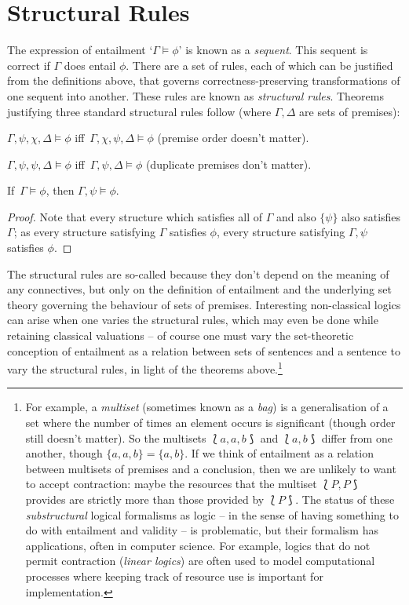 \section{Structural Rules}\label{twostruct}

The expression of entailment ‘$\Gamma \vDash \phi$’ is known as a \emph{sequent}. This sequent is correct if $\Gamma$ does entail $\phi$. There are a set of rules, each of which can be justified from the definitions above, that governs correctness-preserving transformations of one sequent into another. These rules are known as \emph{structural rules}. Theorems justifying three standard structural rules follow (where $\Gamma, \Delta$ are sets of premises): \begin{theorem}[Permutation] $\Gamma, \psi,\chi,\Delta \vDash \phi$ iff\, $\Gamma, \chi,\psi,\Delta \vDash \phi$ (premise order doesn't matter).\end{theorem}
\begin{theorem}[Contraction]$\Gamma, \psi,\psi, \Delta \vDash \phi$ iff\, $\Gamma, \psi,\Delta \vDash \phi$ (duplicate premises don't matter).
\end{theorem}
\begin{theorem}
	[Weakening] If\, $\Gamma \vDash \phi$, then $\Gamma, \psi \vDash	\phi$.
	\begin{proof}
		Note that every structure which satisfies all of $\Gamma$ and also $\{\psi\}$ also satisfies $\Gamma$; as every structure satisfying $\Gamma$ satisfies $\phi$, every structure satisfying $\Gamma, \psi$ satisfies $\phi$.
	\end{proof}
\end{theorem}
The structural rules are so-called because they don't depend on the meaning of any connectives, but only on the definition of entailment and the underlying set theory governing the behaviour of sets of premises. Interesting non-classical logics can arise when one varies the structural rules, which may even be done while retaining classical valuations \citep{restsub} – of course one must vary the set-theoretic conception of entailment as a relation between sets of sentences and a sentence to vary the structural rules, in light of the theorems above.\footnote{For example, a \emph{multiset} (sometimes known as a \emph{bag}) is a generalisation of a set where the number of times an element occurs is significant (though order still doesn't matter). So the multisets $⟅a,a,b⟆$ and $⟅a,b⟆$ differ from one another, though $\{a,a,b\}=\{a,b\}$. If we think of entailment as a relation between multisets of premises and a conclusion, then we are unlikely to want to accept contraction: maybe the resources that the multiset $⟅P,P⟆$ provides are strictly more than those provided by $⟅P⟆$. The status of these \emph{substructural} logical formalisms as logic – in the sense of having something to do with entailment and validity – is problematic, but their formalism has applications, often in computer science. For example, logics that do not permit contraction (\emph{linear logics}) are often used to model computational processes where keeping track of resource use is important for implementation.}

